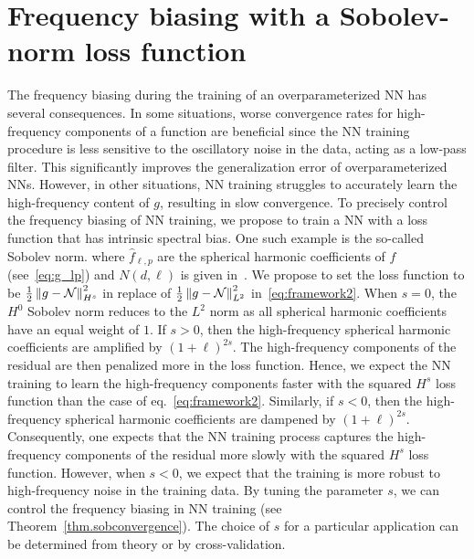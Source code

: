 \documentclass{article} %
\begin{document}
\section{Frequency biasing with a Sobolev-norm loss function}\label{sec:sobolev}

The frequency biasing during the training of an overparameterized NN has several consequences. In some situations, worse convergence rates for high-frequency components of a function are beneficial since the NN training procedure is less sensitive to the oscillatory noise in the data, acting as a low-pass filter. This significantly improves the generalization error of overparameterized NNs. However, in other situations, NN training struggles to accurately learn the high-frequency content of $g$, resulting in slow convergence. To precisely control the frequency biasing of NN training, we propose to train a NN with a loss function that has intrinsic spectral bias. One such example is the so-called Sobolev norm.  %
where $\hat{f}_{\ell,p}$ are the spherical harmonic coefficients of $f$ (see~\cref{eq:g_lp}) and $N(d,\ell)$ is given in~. We propose to set the loss function to be $\frac{1}{2}\left\lVert g-{\mathcal{N}}\right\rVert_{H^s}^2$ in replace of $\frac{1}{2}\left\lVert g-{\mathcal{N}}\right\rVert_{L^2}^2$ in~\cref{eq:framework2}. When $s = 0$, the $H^0$ Sobolev norm reduces to the $L^2$ norm as all spherical harmonic coefficients have an equal weight of $1$. If $s > 0$, then the high-frequency spherical harmonic coefficients are amplified by $(1+\ell)^{2s}$. The high-frequency components of the residual are then penalized more in the loss function. Hence, we expect the NN training to learn the high-frequency components faster with the squared $H^s$ loss function than the case of eq.~\eqref{eq:framework2}. Similarly, if $s < 0$, then the high-frequency spherical harmonic coefficients are dampened by $(1+\ell)^{2s}$. Consequently, one expects that the NN training process captures the high-frequency components of the residual more slowly with the squared $H^s$ loss function. However, when $s < 0$, we expect that the training is more robust to high-frequency noise in the training data. By tuning the parameter $s$, we can control the frequency biasing in NN training (see Theorem~\ref{thm.sobconvergence}). The choice of $s$ for a particular application can be determined from theory or by cross-validation.
\end{document}
